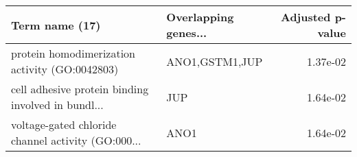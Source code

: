 \begin{tabular}{llr}
\toprule
                                    Term name (17) & Overlapping genes... &  Adjusted p-value \\
\midrule
    protein homodimerization activity (GO:0042803) &       ANO1,GSTM1,JUP &          1.37e-02 \\
cell adhesive protein binding involved in bundl... &                  JUP &          1.64e-02 \\
voltage-gated chloride channel activity (GO:000... &                 ANO1 &          1.64e-02 \\
\bottomrule
\end{tabular}
